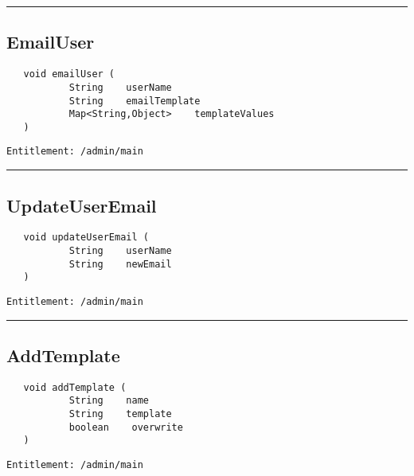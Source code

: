 \rule{12cm}{2pt}
\subsection{EmailUser}
\label{Api:EmailUser}
\begin{verbatim}
   void emailUser (
           String    userName
           String    emailTemplate
           Map<String,Object>    templateValues
   )
\end{verbatim}
\begin{Verbatim}[fontsize=\small, formatcom=\color{Maroon}]
  Entitlement: /admin/main
\end{Verbatim}



\rule{12cm}{2pt}
\subsection{UpdateUserEmail}
\label{Api:UpdateUserEmail}
\begin{verbatim}
   void updateUserEmail (
           String    userName
           String    newEmail
   )
\end{verbatim}
\begin{Verbatim}[fontsize=\small, formatcom=\color{Maroon}]
  Entitlement: /admin/main
\end{Verbatim}



\rule{12cm}{2pt}
\subsection{AddTemplate}
\label{Api:AddTemplate}
\begin{verbatim}
   void addTemplate (
           String    name
           String    template
           boolean    overwrite
   )
\end{verbatim}
\begin{Verbatim}[fontsize=\small, formatcom=\color{Maroon}]
  Entitlement: /admin/main
\end{Verbatim}



